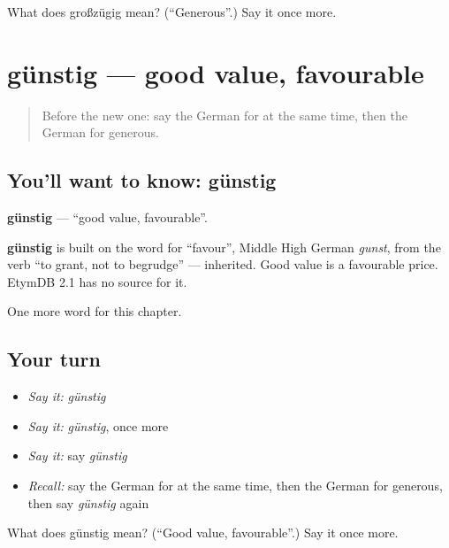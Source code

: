 \begin{tcolorbox}[breakable,colback=teal!4,colframe=teal!35!black,title={Before you move on}]
What does großzügig mean? (\textquotedblleft{}Generous\textquotedblright{}.) Say it once more.
\end{tcolorbox}
\section[günstig]{günstig — good value, favourable}

\label{lesson:GE-C215-guenstig}



\begin{quote}
Before the new one: say the German for at the same time, then the German for generous.
\end{quote}

\subsection*{You'll want to know: günstig}
\textbf{günstig} — \textquotedblleft{}good value, favourable\textquotedblright{}.

\begin{cousinweb}
\textbf{günstig} is built on the word for \textquotedblleft{}favour\textquotedblright{}, Middle High German \emph{gunst}, from the verb \textquotedblleft{}to grant, not to begrudge\textquotedblright{} — inherited. Good value is a favourable price. EtymDB 2.1 has no source for it.
\end{cousinweb}

\begin{grammarlens}[title={What you've built}]
One more word for this chapter.
\end{grammarlens}

\subsection*{Your turn}
\begin{itemize}
\raggedright
  \item \emph{Say it:} \emph{günstig}
  \item \emph{Say it:} \emph{günstig}, once more
  \item \emph{Say it:} say \emph{günstig}
  \item \emph{Recall:} say the German for at the same time, then the German for generous, then say \emph{günstig} again
\end{itemize}

\begin{tcolorbox}[breakable,colback=teal!4,colframe=teal!35!black,title={Before you move on}]
What does günstig mean? (\textquotedblleft{}Good value, favourable\textquotedblright{}.) Say it once more.
\end{tcolorbox}
